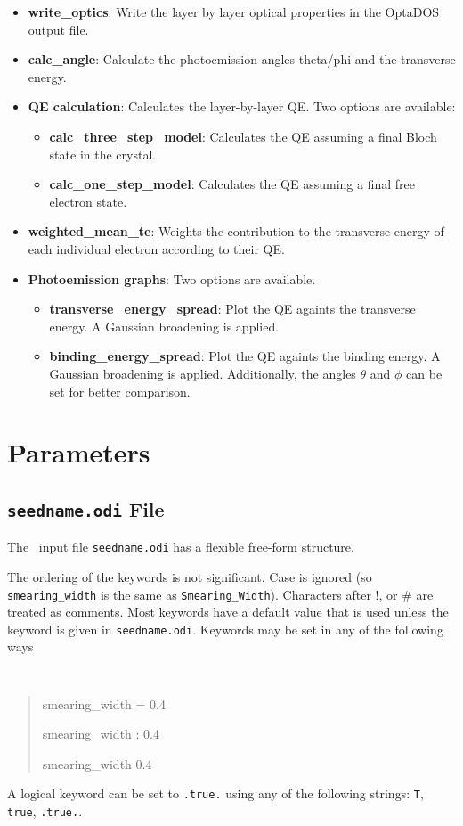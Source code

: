 \documentclass[a4paper,11pt,twoside]{book}
\begin{document}
\begin{itemize}
\item  {\bf write\_optics}: Write the layer by layer optical properties in the OptaDOS output file.	
	
\item  {\bf calc\_angle}: Calculate the photoemission angles theta/phi and the transverse energy.

\item  {\bf QE calculation}: Calculates the layer-by-layer QE.
    Two options are available:
	\begin{itemize}
	\item {\bf calc\_three\_step\_model}: Calculates the QE assuming a final Bloch state in the crystal.
	\item {\bf calc\_one\_step\_model}: Calculates the QE assuming a final free electron state.

        \end{itemize}
\item  {\bf weighted\_mean\_te}: Weights the contribution to the transverse energy of each individual electron according to their QE.

\item  {\bf Photoemission graphs}: Two options are available.
	\begin{itemize}
	\item {\bf transverse\_energy\_spread}: Plot the QE againts the transverse energy. A Gaussian broadening is applied.
	\item {\bf binding\_energy\_spread}: Plot the QE againts the binding energy. A Gaussian broadening is applied. Additionally, the angles $\theta$ and $\phi$ can be set for better comparison.
        \end{itemize}

\end{itemize}

\chapter{Parameters}\label{chap:parameters}

\section{{\tt seedname.odi} File}
The \optados\ input file {\tt seedname.odi} has a flexible free-form
structure. 

The ordering of the keywords is not significant. Case is ignored (so
\verb#smearing_width# is the same as \verb#Smearing_Width#). Characters after !, or \#
are treated as comments. Most keywords have a default value that is
used unless the keyword is given in {\tt seedname.odi}. Keywords may be set
in any of the following ways
{\tt
\begin{quote}
smearing\_width = 0.4

smearing\_width : 0.4

smearing\_width   0.4
\end{quote} }
A logical keyword can be set to {\tt .true.} using any of the following
strings: {\tt T}, {\tt true}, {\tt .true.}.
\end{document}
